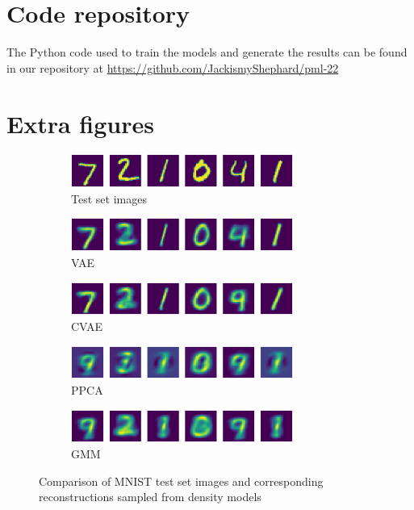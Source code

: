 
\section{Code repository}
The Python code used to train the models and generate the results can be found in our repository at 
\url{https://github.com/JackismyShephard/pml-22}

\section{Extra figures}
\begin{figure}[!h]
	\begin{subfigure}[t]{1\textwidth}
		\centering
		\includegraphics[width = 0.8\textwidth]{figures/ppca/real}
		\caption{Test set images}
	\end{subfigure}
	\begin{subfigure}[t]{1\textwidth}
		\centering
		\includegraphics[width = 0.8\textwidth]{figures/vae/mean}
		\caption{VAE}
	\end{subfigure}
	\begin{subfigure}[t]{1\textwidth}
		\centering
		\includegraphics[width = 0.8\textwidth]{figures/cvae/mean}
		\caption{CVAE}
	\end{subfigure}
	\begin{subfigure}[t]{1\textwidth}
		\centering
		\includegraphics[width = 0.8\textwidth]{figures/ppca/mean}
		\caption{PPCA}
	\end{subfigure}
	\begin{subfigure}[t]{1\textwidth}
		\centering
		\includegraphics[width = 0.8\textwidth]{figures/gmm/mean}
		\caption{GMM}
	\end{subfigure}
	\caption{Comparison of MNIST test set images and corresponding reconstructions sampled from density models}
\end{figure}

